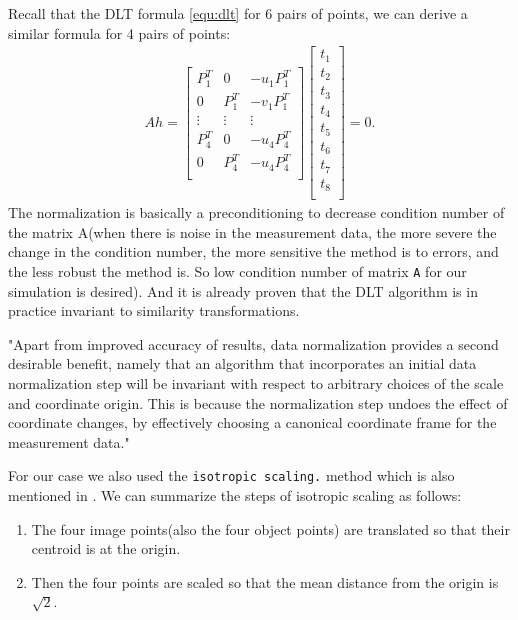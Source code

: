 Recall that the DLT formula \ref{equ:dlt} for 6 pairs of points, we can derive a similar formula for 4 pairs of points:
\begin{align}\label{equ:ah4}
 Ah = \begin{bmatrix} P_1^T & 0 & -u_1P_1^T\\
                 0 & P_1^T & -v_1P_1^T\\
                 \vdots & \vdots & \vdots\\
                 P_4^T & 0 & -u_4P_4^T\\
                 0 & P_4^T & -u_4P_4^T\\ \end{bmatrix} 
 \begin{bmatrix} t_1 \\ t_2 \\ t_3 \\ t_4 \\
                 t_5 \\ t_6 \\ t_7 \\ t_8 \\ \end{bmatrix} 
 = 0.         
\end{align}
The normalization is basically a preconditioning to decrease condition number of the matrix A(when there is noise in the measurement data, the more severe the change in the condition number, the more sensitive the method is to errors, and the less robust the method is. So low condition number of matrix \texttt{A} for our simulation is desired).
And it is already proven that the DLT algorithm is in practice invariant to similarity transformations\cite{hartley2000multiple}.

"Apart from improved accuracy of results, data normalization provides a second desirable benefit, namely that an algorithm that incorporates an initial data normalization step will be invariant with respect to arbitrary choices of the scale and coordinate origin. This is because the normalization step undoes the effect of coordinate changes, by effectively choosing a canonical coordinate frame for the measurement data.\cite{hartley2000multiple}"

For our case we also used the \texttt{isotropic scaling.} method which is also mentioned in \cite{hartley2000multiple}.
We can summarize the steps of isotropic scaling as follows:
\begin{enumerate}
\item The four image points(also the four object points) are translated so that their centroid is at the origin.
\item Then the four points are scaled so that the mean distance from the origin is $ \sqrt{2}$.
\end{enumerate}

